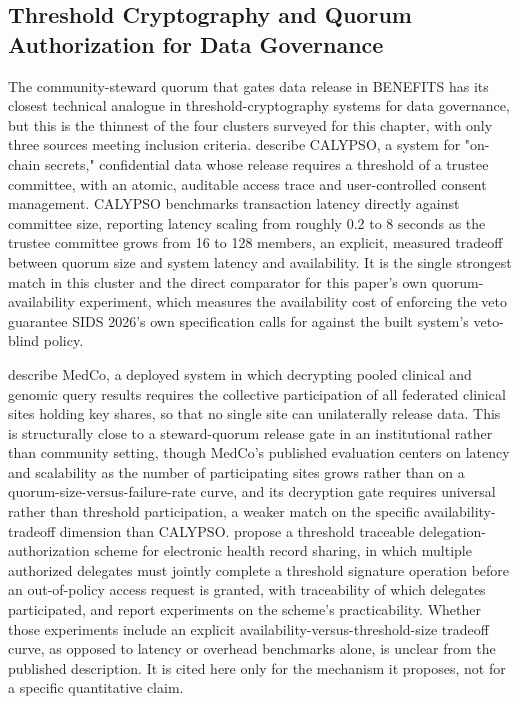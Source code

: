 \subsection{Threshold Cryptography and Quorum Authorization for Data Governance}

The community-steward quorum that gates data release in BENEFITS has its closest technical analogue in threshold-cryptography systems for data governance, but this is the thinnest of the four clusters surveyed for this chapter, with only three sources meeting inclusion criteria. \cite{kokoriskogias2020} describe CALYPSO, a system for "on-chain secrets," confidential data whose release requires a threshold of a trustee committee, with an atomic, auditable access trace and user-controlled consent management. CALYPSO benchmarks transaction latency directly against committee size, reporting latency scaling from roughly 0.2 to 8 seconds as the trustee committee grows from 16 to 128 members, an explicit, measured tradeoff between quorum size and system latency and availability. It is the single strongest match in this cluster and the direct comparator for this paper's own quorum-availability experiment, which measures the availability cost of enforcing the veto guarantee SIDS 2026's own specification calls for against the built system's veto-blind policy.

\cite{raisaro2019} describe MedCo, a deployed system in which decrypting pooled clinical and genomic query results requires the collective participation of all federated clinical sites holding key shares, so that no single site can unilaterally release data. This is structurally close to a steward-quorum release gate in an institutional rather than community setting, though MedCo's published evaluation centers on latency and scalability as the number of participating sites grows rather than on a quorum-size-versus-failure-rate curve, and its decryption gate requires universal rather than threshold participation, a weaker match on the specific availability-tradeoff dimension than CALYPSO. \cite{zhao2024} propose a threshold traceable delegation-authorization scheme for electronic health record sharing, in which multiple authorized delegates must jointly complete a threshold signature operation before an out-of-policy access request is granted, with traceability of which delegates participated, and report experiments on the scheme's practicability. Whether those experiments include an explicit availability-versus-threshold-size tradeoff curve, as opposed to latency or overhead benchmarks alone, is unclear from the published description. It is cited here only for the mechanism it proposes, not for a specific quantitative claim.


